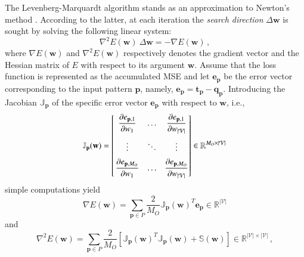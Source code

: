 \documentclass{elsarticle}
\numberwithin{equation}{section}
\theoremstyle{theorem}
\theoremstyle{definition}
\theoremstyle{remark}
\theoremstyle{proposition}
\numberwithin{figure}{section}
\begin{document}
		The Levenberg-Marquardt algorithm \cite{Mar63} stands as an approximation to Newton's method \cite{Hag94}. According to the latter, at each iteration the \emph{search direction} $\Delta \mathbf{w}$ is sought by solving the following linear system:
		\begin{equation}
			\label{eq:newton}
			\nabla^2 E(\mathbf{w}) ~ \Delta \mathbf{w} = - \nabla E(\mathbf{w}) \, ,
		\end{equation}
		where $\nabla E(\mathbf{w})$ and $\nabla^2 E(\mathbf{w})$ respectively denotes the gradient vector and the Hessian matrix of $E$ with respect to its argument $\mathbf{w}$. Assume that the loss function is represented as the accumulated MSE and let $\mathbf{e}_{\mathbf{p}}$ be the error vector corresponding to the input pattern $\mathbf{p}$, namely, $\mathbf{e}_{\mathbf{p}} = \mathbf{t}_{\mathbf{p}} - \mathbf{q}_{\mathbf{p}}$. Introducing the Jacobian $\mathbb{J}_{\mathbf{p}}$ of the specific error vector $\mathbf{e}_{\mathbf{p}}$ with respect to $\mathbf{w}$, i.e., 
		\begin{equation*}
			\label{eq:jacobian}
			\mathbb{J}_{\mathbf{p}}(\mathbf{w}) = 
			\begin{bmatrix}
				\vspace*{0.2cm}
				\hspace*{-0.3cm} & \dfrac{\partial e_{\mathbf{p},1}}{\partial w_1} & \ldots & \dfrac{\partial e_{\mathbf{p},1}}{\partial w_{|\mathcal{V}|}} \\
				\vspace*{0.2cm}
				\hspace*{-0.3cm} & \vdots & \ddots & \vdots \\
				\hspace*{-0.3cm} & \dfrac{\partial e_{\mathbf{p},M_O}}{\partial w_1} & \ldots & \dfrac{\partial e_{\mathbf{p},M_O}}{\partial w_{|\mathcal{V}|}}
			\end{bmatrix}
			\in \mathbb{R}^{M_O \times |\mathcal{V}|}
		\end{equation*}
		simple computations yield
		\begin{equation}
			\label{eq:gradient}
			\nabla E(\mathbf{w}) = \sum_{\mathbf{p} \in P} \dfrac{2}{M_O} \mathbb{J}_{\mathbf{p}}(\mathbf{w})^T \mathbf{e}_{\mathbf{p}} \in \mathbb{R}^{|\mathcal{V}|}
		\end{equation}
		and
		\begin{equation}
			\label{eq:hessian}
			\nabla^2 E(\mathbf{w}) = \sum_{\mathbf{p} \in P} \dfrac{2}{M_O} \left[ \mathbb{J}_{\mathbf{p}}(\mathbf{w})^T \mathbb{J}_{\mathbf{p}}(\mathbf{w}) + \mathbb{S}(\mathbf{w}) \right] \in \mathbb{R}^{|\mathcal{V}| \times |\mathcal{V}|} \, ,
		\end{equation}
\end{document}
